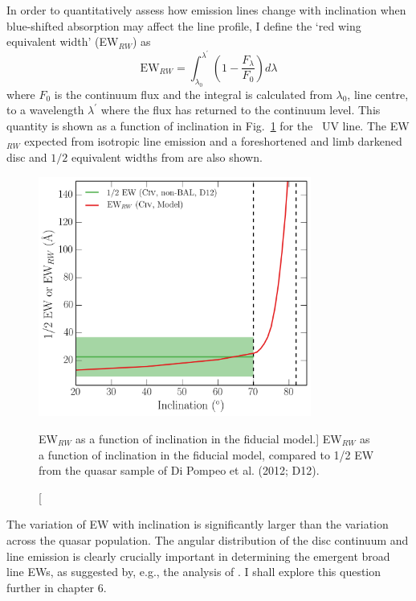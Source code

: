 In order to quantitatively assess how emission lines change with 
inclination when blue-shifted absorption 
may affect the line profile, I define the `red wing equivalent width' (EW$_{RW}$) as
\begin{equation}
\mathrm{EW}_{RW} = \int_{\lambda_0}^{\lambda^\prime} \left( 1 - \frac{F_\lambda}{F_0} \right) d\lambda
\label{rwew}
\end{equation}
where $F_0$ is the continuum flux and the integral is calculated from $\lambda_0$, line centre,
to a wavelength $\lambda^\prime$ where the flux has returned to the continuum level.
This quantity is shown as a function of inclination in Fig.~\ref{fig:ew_in_model} for the \civ\ UV line.
The EW$_{RW}$ expected from isotropic line emission and a foreshortened 
and limb darkened disc and $1/2$ equivalent widths from 
\cite{dipompeo2012b} are also shown.

\begin{figure}
\centering
\includegraphics[width=0.8\textwidth]{figures/ewpaper/ew.png}
\caption
[EW$_{RW}$ as a function of inclination in the fiducial model.]
{
EW$_{RW}$ as a function of inclination in the fiducial model, compared
to 1/2 EW from the quasar sample of Di Pompeo et al. (2012; D12).
}
\label{fig:ew_in_model}
\end{figure}

The variation of EW with inclination is significantly 
larger than the variation across the quasar population.
The angular distribution of the disc 
continuum and line emission is clearly crucially important in 
determining the emergent broad line EWs, as suggested by, e.g., 
the analysis of \cite{risaliti2011}. 
I shall explore this question further in chapter 6.  


